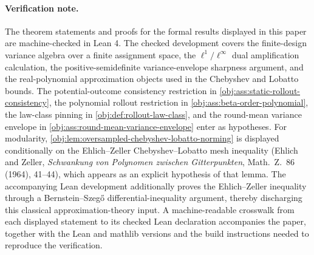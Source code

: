 \paragraph{Verification note.}
The theorem statements and proofs for the formal results displayed in this paper are machine-checked in Lean 4. The checked development covers the finite-design variance algebra over a finite assignment space, the \(\ell^1/\ell^\infty\) dual amplification calculation, the positive-semidefinite variance-envelope sharpness argument, and the real-polynomial approximation objects used in the Chebyshev and Lobatto bounds. The potential-outcome consistency restriction in \cref{obj:ass:static-rollout-consistency}, the polynomial rollout restriction in \cref{obj:ass:beta-order-polynomial}, the law-class pinning in \cref{obj:def:rollout-law-class}, and the round-mean variance envelope in \cref{obj:ass:round-mean-variance-envelope} enter as hypotheses. For modularity, \cref{obj:lem:oversampled-chebyshev-lobatto-norming} is displayed conditionally on the Ehlich--Zeller Chebyshev--Lobatto mesh inequality (Ehlich and Zeller, \emph{Schwankung von Polynomen zwischen Gitterpunkten}, Math.\ Z.\ 86 (1964), 41--44), which appears as an explicit hypothesis of that lemma. The accompanying Lean development additionally proves the Ehlich--Zeller inequality through a Bernstein--Szeg\H{o} differential-inequality argument, thereby discharging this classical approximation-theory input. A machine-readable crosswalk from each displayed statement to its checked Lean declaration accompanies the paper, together with the Lean and mathlib versions and the build instructions needed to reproduce the verification.
